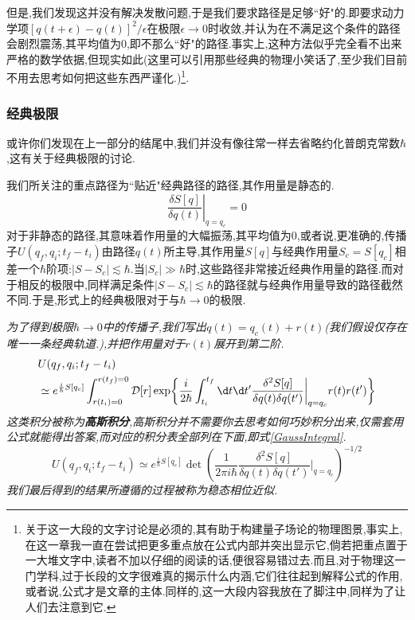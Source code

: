 但是,我们发现这并没有解决发散问题,于是我们要求路径是足够``好"的.即要求动力学项$[q(t+\epsilon)-q(t)]^2/\epsilon$在极限$\epsilon\to0$时收敛,并认为在不满足这个条件的路径会剧烈震荡,其平均值为$ 0 $,即不那么``好"的路径.事实上,这种方法似乎完全看不出来严格的数学依据,但现实如此(这里可以引用那些经典的物理小笑话了,至少我们目前不用去思考如何把这些东西严谨化.)\footnote{关于这一大段的文字讨论是必须的,其有助于构建量子场论的物理图景,事实上,在这一章我一直在尝试把更多重点放在公式内部并突出显示它,倘若把重点置于一大堆文字中,读者不加以仔细的阅读的话,便很容易错过去.而且,对于物理这一门学科,过于长段的文字很难真的揭示什么内涵,它们往往起到解释公式的作用,或者说,公式才是文章的主体.同样的,这一大段内容我放在了脚注中,同样为了让人们去注意到它.}.

\subsubsection{经典极限}
或许你们发现在上一部分的结尾中,我们并没有像往常一样去省略约化普朗克常数$\hbar$,这有关于经典极限的讨论.

我们所关注的重点路径为``贴近"经典路径的路径,其作用量是静态的.
\begin{equation}
	\left.\frac{\delta S[q]}{\delta q(t)}\right|_{q=q_c}=0
\end{equation}
对于非静态的路径,其意味着作用量的大幅振荡,其平均值为0,或者说,更准确的,传播子$U(q_f,q_i;t_f-t_i)$由路径$q(t)$所主导,其作用量$S[q]$与经典作用量$S_c=S[q_c]$相差一个$\hbar$阶项:$|S-S_c|\lesssim\hbar$.当$|S_c|\gg\hbar $时,这些路径非常接近经典作用量的路径.而对于相反的极限中,同样满足条件$|S-S_c|\lesssim\hbar$的路径就与经典作用量导致的路径截然不同.于是,形式上的经典极限对于与$\hbar\to0$的极限.

\begin{remark}
		\textit{为了得到极限$\hbar\to0$中的传播子,我们写出$q(t)=q_c(t)+r(t)$(我们假设仅存在唯一一条经典轨道.),并把作用量对于$r(t)$展开到第二阶.}
		\begin{equation}
			\begin{aligned}&U(q_f,q_i;t_f-t_i)\\&\simeq e^{\frac{i}{\hbar}S[q_c]}\int_{r(t_i)=0}^{r(t_f)=0}\mathcal{D}[r]\exp\biggl\{\frac{i}{2\hbar}\int_{t_i}^{t_f}\d t \d t' \frac{\delta^2S[q]}{\delta q(t)\delta q(t')}\biggr|_{q=q_c}r(t)r(t')\biggr\}\end{aligned}
		\end{equation}
		\textit{这类积分被称为\textbf{高斯积分},高斯积分并不需要你去思考如何巧妙积分出来,仅需套用公式就能得出答案,而对应的积分表全部列在下面,即式\ref{GaussIntegral}.}
		\begin{equation}
			U(q_f,q_i;t_f-t_i)\simeq e^{\frac{i}{\hbar}S[q_c]}\det\left(\frac{1}{2\pi i\hbar}\frac{\delta^2S[q]}{\delta q(t)\delta q(t')}\bigg|_{q=q_c}\right)^{-1/2}
		\end{equation}
		\textit{我们最后得到的结果所遵循的过程被称为稳态相位近似.}
\end{remark}
